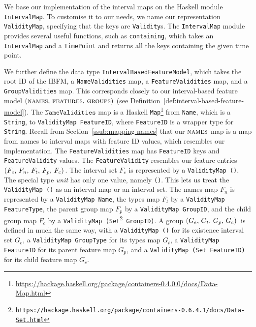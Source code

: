 We base our implementation of the interval maps on the Haskell module \texttt{IntervalMap}. To customise it to our needs, we name our representation \texttt{ValidityMap}, specifying that the keys are \texttt{Validity}s. The \texttt{IntervalMap} module provides several useful functions, such as \texttt{containing}, which takes an \texttt{IntervalMap} and a \texttt{TimePoint} and returns all the keys containing the given time point.

We further define the data type \texttt{IntervalBasedFeatureModel}, which takes the root ID of the IBFM, a \texttt{NameValidities} map, a \texttt{FeatureValidities} map, and a \texttt{GroupValidities} map. This corresponds closely to our interval-based feature model  $(\textsc{names},\,\allowbreak\textsc{features},\, \textsc{groups}{})$ (see Definition~\vref{def:interval-based-feature-model}). The $\texttt{NameValidities}$ map is a Haskell \texttt{Map}\footnote{\url{https://hackage.haskell.org/package/containers-0.4.0.0/docs/Data-Map.html}} from \texttt{Name}, which is a \texttt{String}, to \texttt{ValidityMap FeatureID}, where \texttt{FeatureID} is a wrapper type for \texttt{String}. Recall from Section~\vref{ssub:mapping-names} that our $\textsc{names}{}$ map is a map from names to interval maps with feature ID values, which resembles our implementation. The \texttt{FeatureValidities} map has \texttt{FeatureID} keys and \texttt{FeatureValidity} values. The \texttt{FeatureValidity} resembles our feature entries $\left(F_e,\, F_n,\, F_t,\, F_p,\, F_c\right){}$. The interval set $F_e$ is represented by a \texttt{ValidityMap ()}. The special type \emph{unit} has only one value, namely \texttt{()}. This lets us treat the \texttt{ValidityMap ()} as an interval map or an interval set. The names map $F_n$ is represented by a \texttt{ValidityMap Name}, the types map $F_t$ by a \texttt{ValidityMap FeatureType}, the parent group map $F_p$ by a \texttt{ValidityMap GroupID}, and the child group map $F_c$ by a \texttt{ValidityMap (Set\footnote{\url{https://hackage.haskell.org/package/containers-0.6.4.1/docs/Data-Set.html}} GroupID)}. A group $\left(G_e,\, G_t,\, G_p,\, G_c\right){}$ is defined in much the same way, with a \texttt{ValidityMap ()} for its existence interval set $G_e$, a \texttt{ValidityMap GroupType} for its types map $G_t$, a \texttt{ValidityMap FeatureID} for its parent feature map $G_p$, and a \texttt{ValidityMap (Set FeatureID)} for its child feature map $G_c$.
